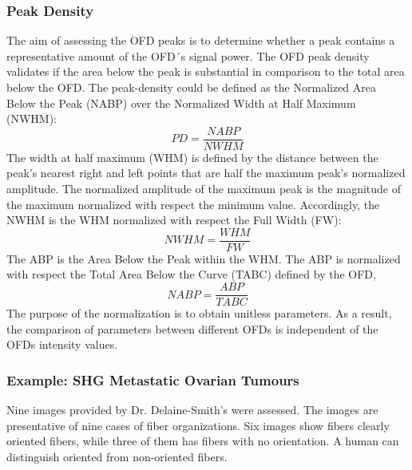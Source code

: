 \documentclass[12pt,a4paper]{article}
\begin{document}
\subsubsection{Peak Density}

The aim of assessing the OFD peaks is to determine whether a peak contains a representative amount of the OFD´s signal power. The OFD peak density validates if the area below the peak is substantial in comparison to the total area below the OFD.  The peak-density  could be defined as the Normalized Area Below the Peak (NABP) over the Normalized Width at Half Maximum (NWHM):
\begin{equation}
PD=\frac{NABP}{NWHM}
\end{equation}
The width at half maximum (WHM) is defined by the distance between the peak's nearest right and left points that are half the maximum peak's normalized amplitude. The normalized amplitude of the maximum peak is the magnitude of the maximum normalized with respect the minimum value.  Accordingly, the NWHM is the WHM normalized with respect the Full Width (FW):
\begin{equation}
NWHM=\frac{WHM}{FW}
\end{equation}
The ABP is the Area Below the Peak within the WHM. The ABP is normalized with respect the Total Area Below the Curve (TABC) defined by the OFD,
\begin{equation}
NABP=\frac{ABP}{TABC}
\end{equation}
The purpose of the normalization is to obtain unitless parameters. As a result, the comparison of parameters between different OFDs is independent of the OFDs intensity values.

\subsubsection{Example: SHG Metastatic Ovarian Tumours}
Nine images provided by Dr. Delaine-Smith’s were assessed. The images are presentative of nine cases of fiber organizations. Six images show fibers clearly oriented fibers, while three of them has fibers with no orientation. A human can distinguish oriented from non-oriented fibers. 
\end{document}
